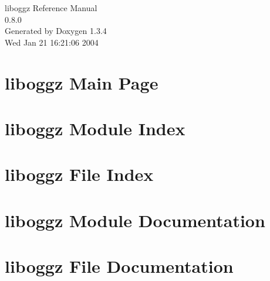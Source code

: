 \documentclass[a4paper]{book}
\begin{document}
\begin{titlepage}
\vspace*{7cm}
\begin{center}
{\Large liboggz Reference Manual\\[1ex]\large 0.8.0 }\\
\vspace*{1cm}
{\large Generated by Doxygen 1.3.4}\\
\vspace*{0.5cm}
{\small Wed Jan 21 16:21:06 2004}\\
\end{center}
\end{titlepage}
\clearemptydoublepage
{}
\tableofcontents
\clearemptydoublepage
{}
\chapter{liboggz Main Page}
\label{index}
\chapter{liboggz Module Index}

\chapter{liboggz File Index}

\chapter{liboggz Module Documentation}










\chapter{liboggz File Documentation}



\printindex
\end{document}
